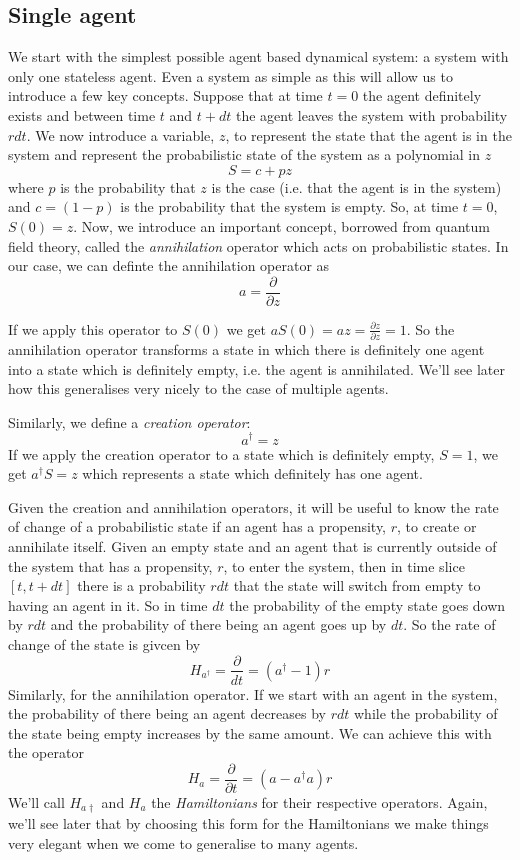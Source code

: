 \documentclass[letterpaper,twocolumn,10pt]{article}
\begin{document}
\subsection{Single agent}
We start with the simplest possible agent based dynamical system: a system with only one stateless agent. Even a system as simple as this will allow us to introduce a few key concepts. Suppose that at time $t=0$ the agent definitely exists and between time $t$ and $t+dt$ the agent leaves the system with probability $rdt$. We now introduce a variable, $z$, to represent the state that the agent is in the system and represent the probabilistic state of the system as a polynomial in $z$
\[
S = c + pz
\]
where $p$ is the probability that $z$ is the case (i.e. that the agent is in the system) and $c = (1-p)$ is the probability that the system is empty. So, at time $t=0$, $S(0) = z$. Now, we introduce an important concept, borrowed from quantum field theory, called the \textit{annihilation} operator which acts on probabilistic states. In our case, we can definte the annihilation operator as
\[
a = \frac{\partial}{\partial z}
\]

If we apply this operator to $S(0)$ we get $aS(0) = az = \frac{\partial z}{\partial z} = 1$. So the annihilation operator transforms a state in which there is definitely one agent into a state which is definitely empty, i.e. the agent is annihilated. We'll see later how this generalises very nicely to the case of multiple agents.

Similarly, we define a \textit{creation operator}:
\[
a^{\dag} = z
\]
If we apply the creation operator to a state which is definitely empty, $S=1$, we get $a^\dag S=z$ which represents a state which definitely has one agent.

Given the creation and annihilation operators, it will be useful to know the rate of change of a probabilistic state if an agent has a propensity, $r$, to create or annihilate itself. Given an empty state and an agent that is currently outside of the system that has a propensity, $r$, to enter the system, then in time slice $[t, t+dt]$ there is a probability $rdt$ that the state will switch from empty to having an agent in it. So in time $dt$ the probability of the empty state goes down by $rdt$ and the probability of there being an agent goes up by $dt$. So the rate of change of the state is givcen by
\[
H_{a^\dag} = \frac{\partial}{dt} = (a^\dag - 1)r
\]
Similarly, for the annihilation operator. If we start with an agent in the system, the probability of there being an agent decreases by $rdt$ while the probability of the state being empty increases by the same amount. We can achieve this with the operator
\[
H_a = \frac{\partial}{\partial t} = (a - a^{\dag}a)r
\]
We'll call $H_{a\dag}$ and $H_a$ the \textit{Hamiltonians} for their respective operators. Again, we'll see later that by choosing this form for the Hamiltonians we make things very elegant when we come to generalise to many agents.
\end{document}
